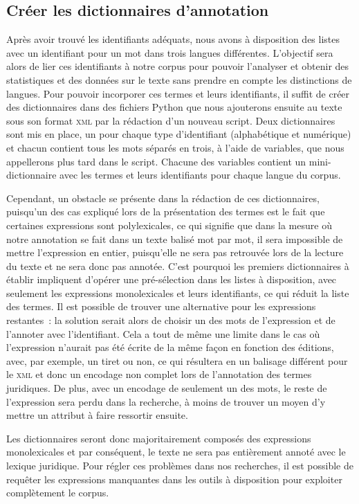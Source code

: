 \subsection{Créer les dictionnaires d'annotation}
Après avoir trouvé les identifiants adéquats, nous avons à disposition des listes avec un identifiant pour un mot dans trois langues différentes. L'objectif sera alors de lier ces identifiants à notre corpus pour pouvoir l'analyser et obtenir des statistiques et des données sur le texte sans prendre en compte les distinctions de langues. Pour pouvoir incorporer ces termes et leurs identifiants, il suffit de créer des dictionnaires dans des fichiers Python que nous ajouterons ensuite au texte sous son format \textsc{xml} par la rédaction d'un nouveau script. Deux dictionnaires sont mis en place, un pour chaque type d'identifiant (alphabétique et numérique) et chacun contient tous les mots séparés en trois, à l'aide de variables, que nous appellerons plus tard dans le script. Chacune des variables contient un mini-dictionnaire avec les termes et leurs identifiants pour chaque langue du corpus.

Cependant, un obstacle se présente dans la rédaction de ces dictionnaires, puisqu'un des cas expliqué lors de la présentation des termes est le fait que certaines expressions sont polylexicales, ce qui signifie que dans la mesure où notre annotation se fait dans un texte balisé mot par mot, il sera impossible de mettre l'expression en entier, puisqu'elle ne sera pas retrouvée lors de la lecture du texte et ne sera donc pas annotée. C'est pourquoi les premiers dictionnaires à établir impliquent d'opérer une pré-sélection dans les listes à disposition, avec seulement les expressions monolexicales et leurs identifiants, ce qui réduit la liste des termes. Il est possible de trouver une alternative pour les expressions restantes~: la solution serait alors de choisir un des mots de l'expression et de l'annoter avec l'identifiant. Cela a tout de même une limite dans le cas où l'expression n'aurait pas été écrite de la même façon en fonction des éditions, avec, par exemple, un tiret ou non, ce qui résultera en un balisage différent pour le \textsc{xml} et donc un encodage non complet lors de l'annotation des termes juridiques. De plus, avec un encodage de seulement un des mots, le reste de l'expression sera perdu dans la recherche, à moins de trouver un moyen d'y mettre un attribut à faire ressortir ensuite.

Les dictionnaires seront donc majoritairement composés des expressions monolexicales et par conséquent, le texte ne sera pas entièrement annoté avec le lexique juridique. Pour régler ces problèmes dans nos recherches, il est possible de requêter les expressions manquantes dans les outils à disposition pour exploiter complètement le corpus.

